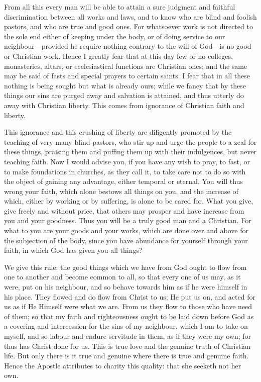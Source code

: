 From all this every man will be able to attain a sure judgment and
faithful discrimination between all works and laws, and to know who are
blind and foolish pastors, and who are true and good ones. For whatsoever
work is not directed to the sole end either of keeping under the body, or
of doing service to our neighbour—provided he require nothing
contrary to the will of God—is no good or Christian work. Hence I
greatly fear that at this day few or no colleges, monasteries, altars, or
ecclesiastical functions are Christian ones; and the same may be said of
fasts and special prayers to certain saints. I fear that in all these
nothing is being sought but what is already ours; while we fancy that by
these things our sins are purged away and salvation is attained, and thus
utterly do away with Christian liberty. This comes from ignorance of
Christian faith and liberty.

This ignorance and this crushing of liberty are diligently promoted by the
teaching of very many blind pastors, who stir up and urge the people to a
zeal for these things, praising them and puffing them up with their
indulgences, but never teaching faith. Now I would advise you, if you have
any wish to pray, to fast, or to make foundations in churches, as they
call it, to take care not to do so with the object of gaining any
advantage, either temporal or eternal. You will thus wrong your faith,
which alone bestows all things on you, and the increase of which, either
by working or by suffering, is alone to be cared for. What you give, give
freely and without price, that others may prosper and have increase from
you and your goodness. Thus you will be a truly good man and a Christian.
For what to you are your goods and your works, which are done over and
above for the subjection of the body, since you have abundance for
yourself through your faith, in which God has given you all things?

We give this rule: the good things which we have from God ought to flow
from one to another and become common to all, so that every one of us may,
as it were, put on his neighbour, and so behave towards him as if he were
himself in his place. They flowed and do flow from Christ to us; He put us
on, and acted for us as if He Himself were what we are. From us they flow
to those who have need of them; so that my faith and righteousness ought
to be laid down before God as a covering and intercession for the sins of
my neighbour, which I am to take on myself, and so labour and endure
servitude in them, as if they were my own; for thus has Christ done for
us. This is true love and the genuine truth of Christian life. But only
there is it true and genuine where there is true and genuine faith. Hence
the Apostle attributes to charity this quality: that she seeketh not her
own.

